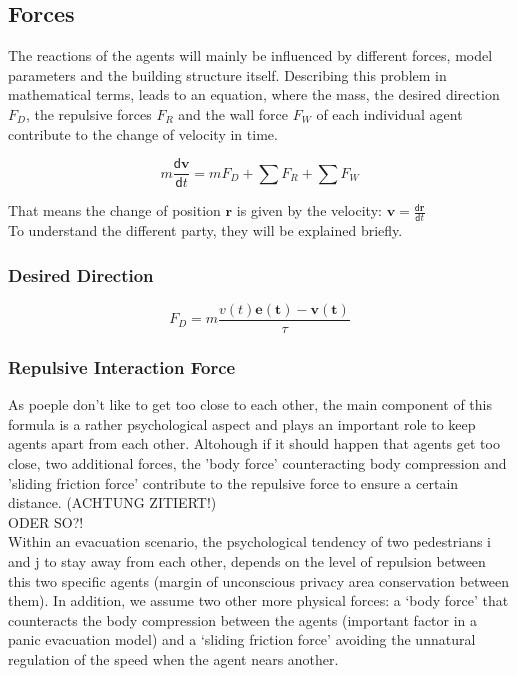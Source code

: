 \documentclass[11pt]{article}
\begin{document}
\subsection {Forces}
The reactions of the agents will mainly be influenced by different forces, model
parameters and the building structure itself. 
Describing this problem in mathematical terms, leads to an equation, where the mass, the desired direction $F_{D}$, the repulsive forces $F_{R}$ and the wall force $F_{W}$ of each individual agent contribute to the change of velocity in time.

\begin{equation} \label{eq:eikonal}
m\frac{\mathsf{d}\mathbf{v}}{\mathsf{d}t}=mF_{D}+\sum{F_{R}}+\sum{F_{W}}
\end{equation}

That means the change of position $\mathbf{r}$ is given by the velocity: $\mathbf{v}=\frac{\mathsf{d}\mathbf{r}}{\mathsf{d}t}$\\
To understand the different party, they will be explained briefly.

\subsubsection{Desired Direction}

\begin{equation} \label{eq:eikonal}
F_{D}=m\frac{v(t)\mathbf{e(t)}-\mathbf{v(t)}}{\tau}
\end{equation}

\subsubsection{Repulsive Interaction Force}
As poeple don't like to get too close to each other, the main component of this formula is a rather psychological aspect and plays an important role to keep agents apart from each other. Altohough if it should happen that agents get too close, two additional forces, the 'body force' counteracting body compression and 'sliding friction force' contribute to the repulsive force to ensure a certain distance. (ACHTUNG ZITIERT!) \\
ODER SO?! \\
Within an evacuation scenario, the psychological tendency of two pedestrians i
and j to stay away from each other, depends on the level of repulsion between
this two specific agents (margin of unconscious privacy area conservation
between them). In addition, we assume two other more physical forces: a `body
force' that counteracts the body compression between the agents (important
factor in a panic evacuation model) and a `sliding friction force' avoiding the
unnatural regulation of the speed when the agent nears another. \cite{SFMPD}
\end{document}

